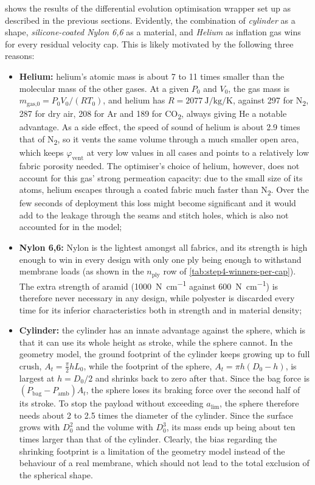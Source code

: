  shows the results of the differential evolution optimisation wrapper set up as described in the previous sections. Evidently, the combination of \textit{cylinder} as a shape, \textit{silicone-coated Nylon 6,6} as a material, and \textit{Helium} as inflation gas wins for every residual velocity cap. This is likely motivated by the following three reasons:
\begin{itemize}
  \item \textbf{Helium:} helium's atomic mass is about 7 to 11 times smaller than the molecular mass of the other gases. At a given $P_0$ and $V_0$, the gas mass is $m_\text{gas,0} = P_0 V_0/(RT_0)$, and helium has $R = \qty{2077}{\joule\per\kilogram\per\kelvin}$, against 297 for N\textsubscript{2}, 287 for dry air, 208 for Ar and 189 for CO\textsubscript{2}, always giving He a notable advantage. As a side effect, the speed of sound of helium is about 2.9 times that of N\textsubscript{2}, so it vents the same volume through a much smaller open area, which keeps $\varphi_\text{vent}$ at very low values in all cases and points to a relatively low fabric porosity needed. The optimiser's choice of helium, however, does not account for this gas' strong permeation capacity: due to the small size of its atoms, helium escapes through a coated fabric much faster than N\textsubscript{2}. Over the few seconds of deployment this loss might become significant and it would add to the leakage through the seams and stitch holes, which is also not accounted for in the model;  

  \item \textbf{Nylon 6,6:} Nylon is the lightest amongst all fabrics, and its strength is high enough to win in every design with only one ply being enough to withstand membrane loads (as shown in the $n_\text{ply}$ row of \cref{tab:step4-winners-per-cap}). The extra strength of aramid (\qty{1000}{\newton\per\centi\metre} against \qty{600}{\newton\per\centi\metre}) is therefore never necessary in any design, while polyester is discarded every time for its inferior characteristics both in strength and in material density;
  

  \item \textbf{Cylinder:} the cylinder has an innate advantage against the sphere, which is that it can use its whole height as stroke, while the sphere cannot. In the geometry model, the ground footprint of the cylinder keeps growing up to full crush, $A_t = \tfrac{\pi}{2} h L_0$, while the footprint of the sphere, $A_t = \pi h (D_0 - h)$, is largest at $h = D_0/2$ and shrinks back to zero after that. Since the bag force is $(P_\text{bag} - P_\text{amb}) A_t$, the sphere loses its braking force over the second half of its stroke. To stop the payload without exceeding $a_\text{lim}$, the sphere therefore needs about 2 to 2.5 times the diameter of the cylinder. Since the surface grows with $D_0^2$ and the volume with $D_0^3$, its mass ends up being about ten times larger than that of the cylinder. Clearly, the bias regarding the shrinking footprint is a limitation of the geometry model instead of the behaviour of a real membrane, which should not lead to the total exclusion of the spherical shape.
\end{itemize}

